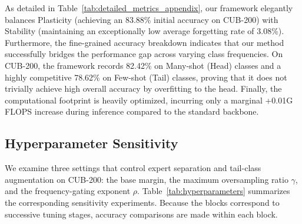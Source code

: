 \documentclass[journal]{IEEEtran}
\theoremstyle{plain}
\theoremstyle{definition}
\theoremstyle{remark}
\begin{document}
As detailed in Table~\ref{tab:detailed_metrics_appendix}, our framework elegantly balances Plasticity (achieving an 83.88\% initial accuracy on CUB-200) with Stability (maintaining an exceptionally low average forgetting rate of 3.08\%). Furthermore, the fine-grained accuracy breakdown indicates that our method successfully bridges the performance gap across varying class frequencies. On CUB-200, the framework records 82.42\% on Many-shot (Head) classes and a highly competitive 78.62\% on Few-shot (Tail) classes, proving that it does not trivially achieve high overall accuracy by overfitting to the head. Finally, the computational footprint is heavily optimized, incurring only a marginal +0.01G FLOPS increase during inference compared to the standard backbone.

\subsection{Hyperparameter Sensitivity}
\label{sec:supp_hyperparameters}

We examine three settings that control expert separation and tail-class augmentation on CUB-200: the base margin, the maximum oversampling ratio $\gamma$, and the frequency-gating exponent $\rho$. Table~\ref{tab:hyperparameters} summarizes the corresponding sensitivity experiments. Because the blocks correspond to successive tuning stages, accuracy comparisons are made within each block.
\end{document}
